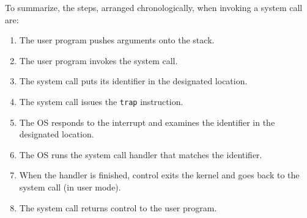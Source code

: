 To summarize, the steps, arranged chronologically, when invoking a system call are:
\begin{enumerate}
	\item The user program pushes arguments onto the stack.
	\item The user program invokes the system call.
	\item The system call puts its identifier in the designated location.
	\item The system call issues the \texttt{trap} instruction.
	\item The OS responds to the interrupt and examines the identifier in the designated location.
	\item The OS runs the system call handler that matches the identifier.
	\item When the handler is finished, control exits the kernel and goes back to the system call (in user mode).
	\item The system call returns control to the user program.

\end{enumerate}






